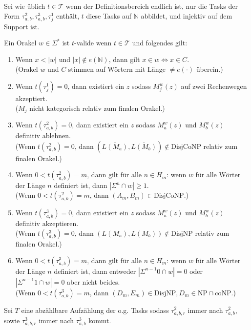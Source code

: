 \documentclass[nofonts]{uebung}
\theoremstyle{definition}
\def\NP{\ensuremath{\mathrm{NP}}}
\def\DisjNP{\ensuremath{\mathrm{DisjNP}}}
\def\DisjCoNP{\ensuremath{\mathrm{DisjCoNP}}}
\def\coNP{\ensuremath{\mathrm{coNP}}}
\begin{document}
Sei wie üblich $t\in \mathcal T$ wenn der Definitionsbereich endlich ist, nur die Tasks der Form $\tau^2_{a,b}, \tau^3_{a,b}, \tau^1_j$ enthält, $t$ diese Tasks auf $\mathbb N$ abbildet, und injektiv auf dem Support ist.

Ein Orakel $w\in\Sigma^*$ ist $t$-valide wenn $t\in\mathcal T$ und folgendes gilt:
\begin{enumerate}[label={V\arabic*}]
    \item Wenn $x<|w|$ und $|x|\not\in e(\mathbb N)$, dann gilt $x\in w\iff x\in C$.\\
        (Orakel $w$ und $C$ stimmen auf Wörtern mit Länge $\neq e(\cdot)$ überein.)
    \item Wenn $t(\tau^1_j)=0$, dann existiert ein $z$ sodass $M_j^w(z)$ auf zwei Rechenwegen akzeptiert.\\
        ($M_j$ nicht kategorisch relativ zum finalen Orakel.)
    \item Wenn $t(\tau^2_{a,b})=0$, dann existiert ein $z$ sodass $M_a^w(z)$ und $M_b^w(z)$ definitiv ablehnen.\\
        (Wenn $t(\tau^2_{a,b})=0$, dann $(\overline{L(M_a)}, \overline{ L(M_b)})\not\in \DisjCoNP$ relativ zum finalen Orakel.)
    \item Wenn $0<t(\tau^2_{a,b})=m$, dann gilt für alle $n\in H_m$: wenn $w$ für alle Wörter der Länge $n$ definiert ist, dann $|\Sigma^n\cap w|\geq 1$.\\
        (Wenn $0<t(\tau^2_{a,b})=m$, dann $(A_m,B_m)\in\DisjCoNP$.)
    \item Wenn $t(\tau^3_{a,b})=0$, dann existiert ein $z$ sodass $M_a^w(z)$ und $M_b^w(z)$ definitiv akzeptieren.\\
        (Wenn $t(\tau^3_{a,b})=0$, dann $({L(M_a)}, { L(M_b)})\not\in \DisjNP$ relativ zum finalen Orakel.)
    \item Wenn $0<t(\tau^3_{a,b})=m$, dann gilt für alle $n\in H_m$: wenn $w$ für alle Wörter der Länge $n$ definiert ist, dann entweder $|\Sigma^{n-1}0\cap w|=0$ oder $|\Sigma^{n-1}1\cap w|=0$ aber nicht beides.\\
        (Wenn $0<t(\tau^3_{a,b})=m$, dann $(D_m,E_m)\in\DisjNP, D_m\in\NP\cap\coNP$.)
\end{enumerate}

Sei $T$ eine abzählbare Aufzählung der o.g. Tasks sodass $\tau^2_{a,b,r}$ immer nach $\tau^2_{a,b}$, sowie $\tau^3_{a,b,r}$ immer nach $\tau^3_{a,b}$ kommt.
\end{document}
